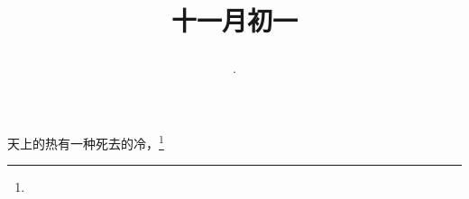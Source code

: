 \title{\date[d=1,m=12,y=2024][year:cn-y,年,month:cn,day:cn,日,·,weekday]·十一月初一 }
天上的热有一种死去的冷，\footnote{ }

